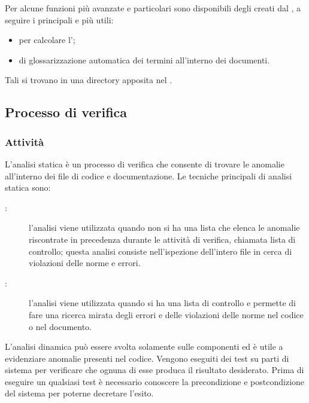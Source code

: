 \documentclass[a4paper, titlepage]{article}
\begin{document}
Per alcune funzioni più avanzate e particolari sono disponibili degli  creati dal , a seguire i principali e più utili:
\begin{itemize}
	\item {} per calcolare l';
	\item {} di glossarizzazione automatica dei termini all'interno dei documenti.
\end{itemize}
Tali  si trovano in una directory apposita nel .

\newpage

\subsection{Processo di verifica}

\subsubsection{Attività}


L'analisi statica è un processo di verifica che consente di trovare le anomalie all'interno dei file di codice e documentazione. Le tecniche principali di analisi statica sono:
\begin{description}
	\item[:] l'analisi  viene utilizzata quando non si ha una lista che elenca le anomalie riscontrate in precedenza durante le attività di verifica, chiamata lista di controllo; questa analisi consiste nell'ispezione dell'intero file in cerca di violazioni delle norme e errori.
	\item[:] l'analisi  viene utilizzata quando si ha una lista di controllo e permette di fare una ricerca mirata degli errori e delle violazioni delle norme nel codice o nel documento.
\end{description}

L'analisi dinamica può essere svolta solamente sulle componenti  ed è utile a evidenziare anomalie presenti nel codice. Vengono eseguiti dei test su parti di sistema per verificare che ognuna di esse produca il risultato desiderato. Prima di eseguire un qualsiasi test è necessario conoscere la precondizione e postcondizione del sistema per poterne decretare l'esito.
\end{document}
